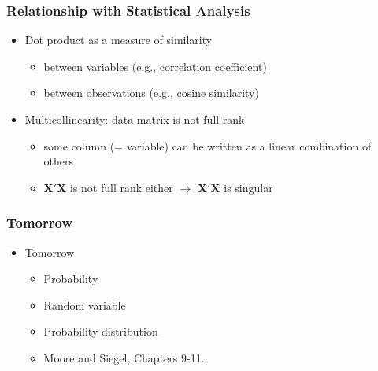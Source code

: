 \documentclass[pdflatex, 12pt]{beamer}
\begin{document}
\begin{frame}
\frametitle{Relationship with Statistical Analysis}
\begin{itemize}
\item Dot product as a measure of similarity
 \begin{itemize}
 \item between variables (e.g., correlation coefficient)
 \item between observations (e.g., cosine similarity)
 \end{itemize}
\vspace{0.4cm}
\item Multicollinearity: data matrix is not full rank 
 \begin{itemize}
 \item some column (= variable) can be written as a linear combination of others
 \item $\bm{X}'\bm{X}$ is not full rank either $\rightarrow$ $\bm{X}'\bm{X}$ is singular
 \end{itemize}
\end{itemize}
\end{frame}

\begin{frame}
\frametitle{Tomorrow}
\begin{itemize}
\item Tomorrow
 \begin{itemize}
 \item Probability
 \item Random variable
 \item Probability distribution
 \item Moore and Siegel, Chapters 9-11.
 \end{itemize}
\end{itemize}
\end{frame}
\end{document}
